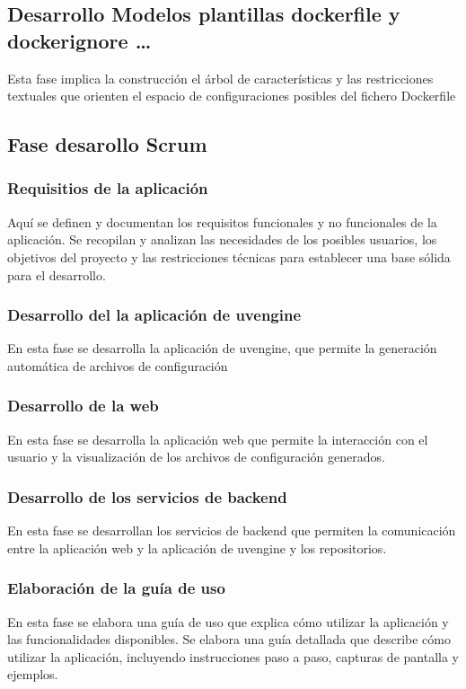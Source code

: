 \documentclass[12pt, a4paper, twoside]{article}
\begin{document}
\subsection{Desarrollo Modelos plantillas dockerfile y dockerignore …}
Esta fase implica la construcción el árbol de características y las restricciones textuales que orienten el espacio de 
configuraciones posibles del fichero Dockerfile 

\subsection{Fase desarollo Scrum}
\subsubsection{Requisitios de la aplicación }
Aquí se definen y documentan los requisitos funcionales y no funcionales de la aplicación. Se recopilan y analizan las 
necesidades de los posibles usuarios, los objetivos del proyecto y las restricciones técnicas para establecer una base 
sólida para el desarrollo.
\subsubsection{Desarrollo del la aplicación de uvengine }
En esta fase se desarrolla la aplicación de uvengine, que permite la generación automática de archivos de configuración
\subsubsection{Desarrollo de la web}
En esta fase se desarrolla la aplicación web que permite la interacción con el usuario y la visualización de los archivos de configuración generados.
\subsubsection{Desarrollo de los servicios de backend}
En esta fase se desarrollan los servicios de backend que permiten la comunicación entre la aplicación web y la aplicación de uvengine y los repositorios.
\subsubsection{Elaboración de la guía de uso}
En esta fase se elabora una guía de uso que explica cómo utilizar la aplicación y las funcionalidades disponibles.
Se elabora una guía detallada que describe cómo utilizar la aplicación, incluyendo instrucciones paso a paso, capturas 
de pantalla y ejemplos. 
\end{document}
